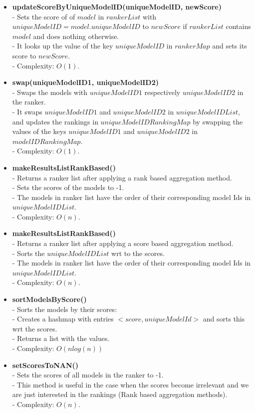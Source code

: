 \documentclass{article}
\begin{document}
\begin{itemize}
		\item \textbf{updateScoreByUniqueModelID(uniqueModelID, newScore)}\\
		- Sets the score of of $model$ in $rankerList$ with $uniqueModelID = model.uniqueModelID$ to $newScore$ if $rankerList$ contains $model$ and does nothing otherwise.\\
		- It looks up the value of the key $uniqueModelID$ in $rankerMap$ and sets its score to $newScore$.\\
		- Complexity: $O(1)$.
		
		\item \textbf{swap(uniqueModelID1, uniqueModelID2)}\\
		- Swaps the models with $uniqueModelID1$ respectively $uniqueModelID2$ in the ranker.\\
		- It swaps $uniqueModelID1$ and $uniqueModelID2$ in $uniqueModelIDList$,\\
		and updates the rankings in $uniqueModelIDRankingMap$ by swapping the values of the keys $uniqueModelID1$ and $uniqueModelID2$ in $modelIDRankingMap$.\\
		- Complexity: $O(1)$. 
		
		\item \textbf{makeResultsListRankBased()}\\
		- Returns a ranker list after applying a rank based aggregation method.\\
		- Sets the scores of the models to -1.\\
		- The models in ranker list have the order of their corresponding model Ids in $uniqueModelIDList$.\\
		- Complexity: $O(n)$.
		
		\item \textbf{makeResultsListRankBased()}\\
		- Returns a ranker list after applying a score based aggregation method.\\
		- Sorts the $uniqueModelIDList$ wrt to the scores.\\
		- The models in ranker list have the order of their corresponding model Ids in $uniqueModelIDList$.\\
		- Complexity: $O(n)$.
		
		\item \textbf{sortModelsByScore()}\\
		- Sorts the models by their scores:\\
		- Creates a hashmap with entries $<score, uniqueModelId>$ and sorts this wrt the scores.\\
		- Returns a list with the values.\\
		- Complexity: $O(n log(n))$ 
		
		\item \textbf{setScoresToNAN()}\\
		- Sets the scores of all models in the ranker to -1.\\
		- This method is useful in the case when the scores become irrelevant and we are just interested in the rankings (Rank based aggregation methods).\\
		- Complexity: $O(n)$.
	\end{itemize}
	
	
\end{document}
